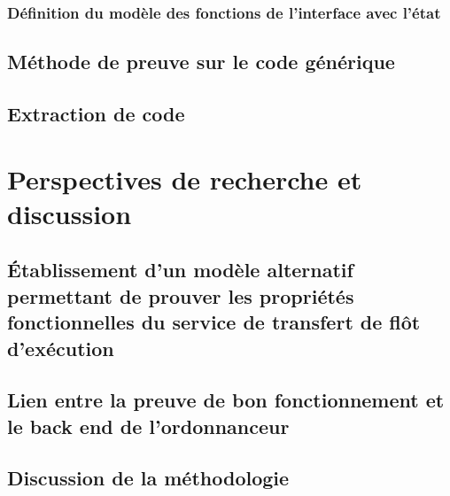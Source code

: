 			\subsubsection{Définition du modèle des fonctions de l'interface avec l'état}

		\subsection{Méthode de preuve sur le code générique}

		\subsection{Extraction de code}


	\section{Perspectives de recherche et discussion}
		\subsection{Établissement d'un modèle alternatif permettant de prouver les propriétés fonctionnelles du service de transfert de flôt d'exécution}
		\subsection{Lien entre la preuve de bon fonctionnement et le back end de l'ordonnanceur}
		\subsection{Discussion de la méthodologie}
